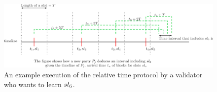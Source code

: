 \begin{figure}[h]
	\centering
	\includegraphics[width=1.\textwidth]{images/relative.png}
	\caption{An example execution of the relative time protocol by a validator who wants to learn $ sl_{6} $.}
	\label{fig:relativetime}
\end{figure}
